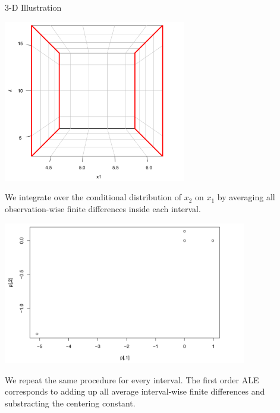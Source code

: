 \begin{vbframe}{3-D Illustration}
\begin{center}
\includegraphics[width=0.6\textwidth]{figure_man/3D05.png}
\end{center}

We integrate over the conditional distribution of $x_2$ on $x_1$ by averaging all observation-wise finite differences inside each interval.

\framebreak


\begin{center}
\includegraphics[width=0.8\textwidth]{figure_man/3D06.png}
\end{center}


We repeat the same procedure for every interval. The first order ALE corresponds to adding up all average interval-wise finite differences and substracting the centering constant.

\end{vbframe}

